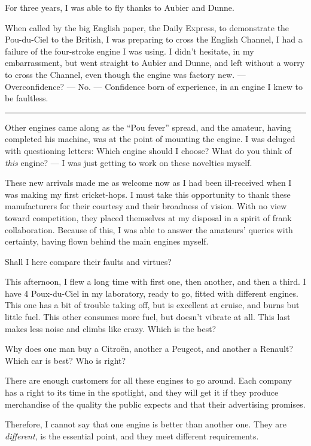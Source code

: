 \documentclass{book}
\newcommand*\sectline{
  \vspace{5pt}
  \begin{center}
    \rule{0.5\linewidth}{\linethickness}
  \end{center}
  \vspace{5pt}
}
\begin{document}
For three years, I was able to fly thanks to Aubier and Dunne.

When called by the big English paper, the Daily Express, to
demonstrate the Pou-du-Ciel to the British, I was preparing to cross
the English Channel, I had a failure of the four-stroke engine I was
using.  I didn't hesitate, in my embarrassment, but went straight to
Aubier and Dunne, and left without a worry to cross the Channel, even
though the engine was factory new. --- Overconfidence? --- No. ---
Confidence born of experience, in an engine I knew to be faultless.

\sectline

Other engines came along as the ``Pou fever'' spread, and the amateur,
having completed his machine, was at the point of mounting the engine.
I was deluged with questioning letters: Which engine should I choose?
What do you think of \textit{this} engine? --- I was just getting to
work on these novelties myself.

These new arrivals made me as welcome now as I had been ill-received
when I was making my first cricket-hops.  I must take this opportunity
to thank these manufacturers for their courtesy and their broadness of
vision.  With no view toward competition, they placed themselves at my
disposal in a spirit of frank collaboration.  Because of this, I was
able to answer the amateurs' queries with certainty, having flown
behind the main engines myself.

Shall I here compare their faults and virtues?

This afternoon, I flew a long time with first one, then another, and
then a third.  I have 4 Poux-du-Ciel in my laboratory, ready to go,
fitted with different engines.  This one has a bit of trouble taking
off, but is excellent at cruise, and burns but little fuel.  This
other consumes more fuel, but doesn't vibrate at all.  This last makes
less noise and climbs like crazy.  Which is the best?

Why does one man buy a Citro\"en, another a Peugeot, and another a
Renault?  Which car is best?  Who is right?

There are enough customers for all these engines to go around.  Each
company has a right to its time in the spotlight, and they will get it
if they produce merchandise of the quality the public expects and that
their advertising promises.

Therefore, I cannot say that one engine is better than another one.
They are \textit{different}, is the essential point, and they meet
different requirements.
\end{document}
